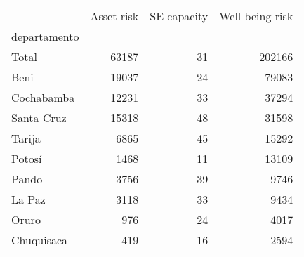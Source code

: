 \begin{tabular}{lrrr}
\toprule
{} &  Asset risk &  SE capacity &  Well-being risk \\
departamento &             &              &                  \\
\midrule
Total        &       63187 &           31 &           202166 \\
Beni         &       19037 &           24 &            79083 \\
Cochabamba   &       12231 &           33 &            37294 \\
Santa Cruz   &       15318 &           48 &            31598 \\
Tarija       &        6865 &           45 &            15292 \\
Potosí       &        1468 &           11 &            13109 \\
Pando        &        3756 &           39 &             9746 \\
La Paz       &        3118 &           33 &             9434 \\
Oruro        &         976 &           24 &             4017 \\
Chuquisaca   &         419 &           16 &             2594 \\
\bottomrule
\end{tabular}
